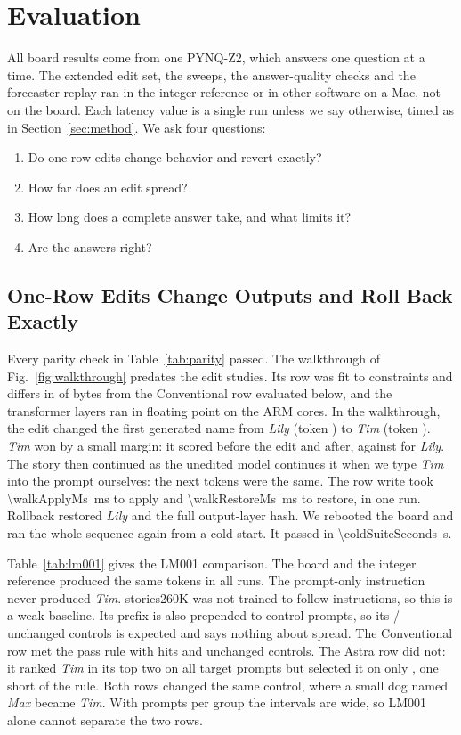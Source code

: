 \documentclass[conference,10pt,letterpaper]{IEEEtran}
\newcommand{\seconds}[1]{\SI{#1}{\second}}
\newcommand{\ms}[1]{\SI{#1}{\milli\second}}
\newcommand{\pynq}{\mbox{PYNQ-Z2}}
\newcommand{\stories}{\mbox{stories260K}}
\begin{document}
\section{Evaluation}
\label{sec:evaluation}

All board results come from one \pynq, which answers one question at a time. The extended edit set, the sweeps, the answer-quality checks and the forecaster replay ran in the integer reference or in other software on a Mac, not on the board. Each latency value is a single run unless we say otherwise, timed as in Section~\ref{sec:method}. We ask four questions:
\begin{enumerate}
\item Do one-row edits change behavior and revert exactly?
\item How far does an edit spread?
\item How long does a complete answer take, and what limits it?
\item Are the answers right?
\end{enumerate}

\subsection{One-Row Edits Change Outputs and Roll Back Exactly}
Every parity check in Table~\ref{tab:parity} passed. The walkthrough of Fig.~\ref{fig:walkthrough} predates the edit studies. Its row was fit to \walkFitConstraints{} constraints and differs in \walkRowDiff{} of \rowBytes{} bytes from the Conventional row evaluated below, and the transformer layers ran in floating point on the ARM cores. In the walkthrough, the edit changed the first generated name from \emph{Lily} (token \lilyToken) to \emph{Tim} (token \timToken). \emph{Tim} won by a small margin: it scored \walkTimScoreBefore{} before the edit and \walkTimScore{} after, against \walkLilySum{} for \emph{Lily}. The story then continued as the unedited model continues it when we type \emph{Tim} into the prompt ourselves: the next \walkPreserved{} tokens were the same. The row write took \ms{\walkApplyMs} to apply and \ms{\walkRestoreMs} to restore, in one run. Rollback restored \emph{Lily} and the full output-layer hash. We rebooted the board and ran the whole sequence again from a cold start. It passed in \seconds{\coldSuiteSeconds}.

Table~\ref{tab:lm001} gives the LM001 comparison. The board and the integer reference produced the same tokens in all \lmRuns{} runs. The prompt-only instruction never produced \emph{Tim}. \stories{} was not trained to follow instructions, so this is a weak baseline. Its prefix is also prepended to control prompts, so its \lmPromptControls/\lmControls{} unchanged controls is expected and says nothing about spread. The Conventional row met the pass rule with \lmConvHits{} hits and \lmConvControls{} unchanged controls. The Astra row did not: it ranked \emph{Tim} in its top two on all \astraTopTwoLm{} target prompts but selected it on only \lmAstraHits, one short of the rule. Both rows changed the same control, where a small dog named \emph{Max} became \emph{Tim}. With \lmTargets{} prompts per group the intervals are wide, so LM001 alone cannot separate the two rows.
\end{document}
